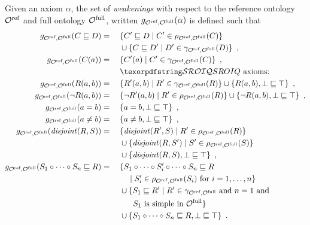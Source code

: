\begin{definition}
Given an axiom $\alpha$, the set of \emph{weakenings} with respect to the reference ontology ${\mathcal{O}^\textnormal{ref}}$ and full ontology ${\mathcal{O}^\textnormal{full}}$, written $g_{{\mathcal{O}^\textnormal{ref}},{\mathcal{O}^\textnormal{full}}}(\alpha)$ is defined such that
\begin{alignat*}{2}
    g_{\Omcref,\Omcfull}(C \sqsubseteq D) &={} &&\{ C' \sqsubseteq D \mid C' \in \rho_{\Omcref,\Omcfull} (C) \} \\
    &&& \cup \{ C \sqsubseteq D' \mid D' \in \gamma_{\Omcref,\Omcfull}(D) \} \enspace, \\
    g_{\Omcref,\Omcfull}(C(a)) &={} && \{ C'(a) \mid C' \in \gamma_{\Omcref,\Omcfull}(C) \} \enspace, \\
    &&& \text{\SROIQ axioms:} \\
    g_{\Omcref,\Omcfull}(R(a, b)) &={} && \{ R'(a, b) \mid R' \in \gamma_{\Omcref,\Omcfull}(R) \} \cup \{ R(a, b), \bot \sqsubseteq \top \} \enspace, \\
    g_{\Omcref,\Omcfull}(\lnot R(a, b)) &={} && \{ \lnot R'(a, b) \mid R' \in \rho_{\Omcref,\Omcfull}(R) \} \cup \{ \lnot R(a, b), \bot \sqsubseteq \top \} \enspace, \\
    g_{\Omcref,\Omcfull}(a = b) &={} && \{ a = b, \bot \sqsubseteq \top \} \enspace, \\
    \quad g_{\Omcref,\Omcfull}(a \not= b) &={} && \{ a \not= b, \bot \sqsubseteq \top \} \enspace, \\
    g_{\Omcref,\Omcfull}(\disjoint(R, S)) &={} &&\{ \disjoint(R', S) \mid R' \in \rho_{\Omcref,\Omcfull} (R) \} \\
    &&& \cup \{ \disjoint(R, S') \mid S' \in \rho_{\Omcref,\Omcfull}(S) \} \\
    &&& \cup \{ \disjoint (R, S), \bot \sqsubseteq \top \} \enspace, \\
    g_{\Omcref,\Omcfull}(S_1 \circ \cdots \circ S_n \sqsubseteq R) &={} && \{ S_1 \circ \cdots \circ S_i' \circ \cdots \circ S_n \sqsubseteq R \\
    &&& \quad \mid S_i' \in \rho_{\Omcref,\Omcfull}(S_i) \text{ for } i = 1, \dots, n \} \\
    &&& \cup \{ S_1 \sqsubseteq R' \mid R' \in \gamma_{\Omcref,\Omcfull} \text{ and } n = 1 \text{ and } \\
    &&& \quad \enspace \, S_1 \text{ is simple in } \Omcfull \} \\
    &&& \cup \{ S_1 \circ \cdots \circ S_n \sqsubseteq R, \bot \sqsubseteq \top \} \enspace.
\end{alignat*}
\end{definition}

